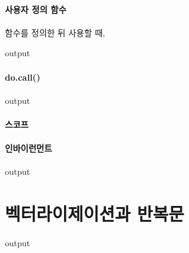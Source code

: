 \documentclass{book}
\begin{document}

\paragraph{사용자 정의 함수}

함수를 정의한 뒤 사용할 때, 
\begin{Schunk}
\begin{Soutput}
output
\end{Soutput}
\end{Schunk}

\paragraph{do.call()}
\begin{Schunk}
\begin{Soutput}
output
\end{Soutput}
\end{Schunk}

\paragraph{스코프}

\paragraph{인바이런먼트}
\begin{Schunk}
\begin{Soutput}
output
\end{Soutput}
\end{Schunk}

\section{벡터라이제이션과 반복문} 
\begin{Schunk}
\begin{Soutput}
output
\end{Soutput}
\end{Schunk}
\end{document}
